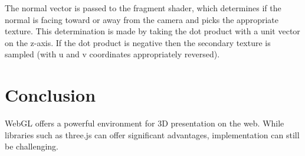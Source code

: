 \documentclass{acmsiggraph}                     %
\begin{document}
The normal vector is passed to the fragment shader, which determines if the normal is facing toward or away from the camera and picks the appropriate texture. This determination is made by taking the dot product with a unit vector on the z-axis. If the dot product is negative then the secondary texture is sampled (with u and v coordinates appropriately reversed).


\section{Conclusion}

WebGL offers a powerful environment for 3D presentation on the web. While libraries such as three.js can offer significant advantages, implementation can still be challenging. 


\nocite{*}

\end{document}
